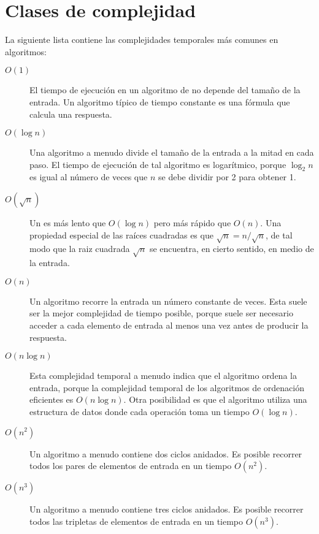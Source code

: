 \section{Clases de complejidad}


La siguiente lista contiene las complejidades temporales más 
comunes en algoritmos:

\begin{description}
\item[$O(1)$]
El tiempo de ejecución en un algoritmo de 
no depende del tamaño de la entrada.
Un algoritmo típico de tiempo constante es una
fórmula que calcula una respuesta.

\item[$O(\log n)$]
Una algoritmo  a menudo divide
el tamaño de la entrada a la mitad en cada paso.
El tiempo de ejecución de tal algoritmo
es logarítmico, porque
$\log_2 n$ es igual al número de veces que
$n$ se debe dividir por 2 para obtener 1.

\item[$O(\sqrt n)$]
Un  es más lento que
$O(\log n)$ pero más rápido que $O(n)$.
Una propiedad especial de las raíces cuadradas es que
$\sqrt n = n/\sqrt n$, de tal modo que la raiz cuadrada $\sqrt n$ se encuentra,
en cierto sentido, en medio de la entrada.

\item[$O(n)$]
Un algoritmo  recorre la entrada
un número constante de veces.
Esta suele ser la mejor complejidad de tiempo posible,
porque suele ser necesario acceder a cada
elemento de entrada al menos una vez antes
de producir la respuesta.

\item[$O(n \log n)$]
Esta complejidad temporal a menudo indica que el
algoritmo ordena la entrada,
porque la complejidad temporal de los
algoritmos de ordenación eficientes es $O(n \log n)$.
Otra posibilidad es que el algoritmo
utiliza una estructura de datos donde cada operación
toma un tiempo $O (\log n)$.

\item[$O(n^2)$]
Un algoritmo  a menudo contiene
dos ciclos anidados.
Es posible recorrer todos los pares de
elementos de entrada en un tiempo $O(n^2)$.

\item[$O(n^3)$]
Un algoritmo   a menudo contiene
tres ciclos anidados.
Es posible recorrer todos las tripletas de
elementos de entrada en un tiempo $O(n^3)$.


\end{description}
